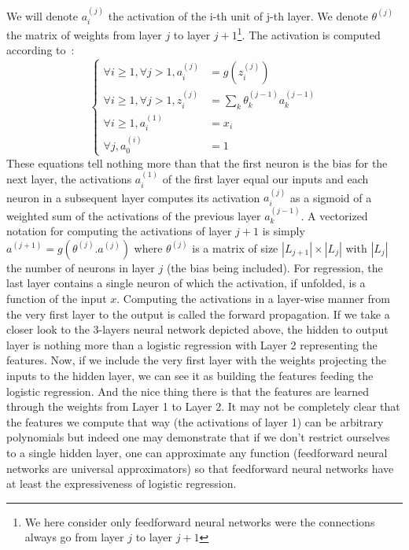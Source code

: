 \documentclass[10pt,a4paper]{article}
\begin{document}
We will denote $a_i^{(j)}$ the activation of the i-th unit of j-th
layer. We denote $\theta^{(j)}$ the matrix of weights from layer $j$
to layer $j+1$\footnote{We here consider only feedforward neural
  networks were the connections always go from layer $j$ to layer
  $j+1$}. The activation is computed according to~:
\begin{equation}
\begin{cases}
\forall i \geq 1, \forall j>1, a_i^{(j)} &= g(z_i^{(j)})\\
\forall i \geq 1, \forall j>1, z_i^{(j)} &= \sum_k \theta_k^{(j-1)} a_k^{(j-1)}\\
\forall i \geq 1, a_i^{(1)} &= x_i\\
\forall j, a_0^{(i)} &= 1
\end{cases}
\end{equation}
These equations tell nothing more than that the first neuron is the
bias for the next layer, the activations $a_i^{(1)}$ of the first layer equal our
inputs and each neuron in a subsequent layer computes its activation $a_i^{(j)}$
as a sigmoid of a weighted sum of the activations of the previous
layer $a_k^{(j-1)}$. A vectorized notation for computing the activations of layer
$j+1$ is simply $a^{(j+1)} = g(\theta^{(j)} . a^{(j)})$ where
$\theta^{(j)}$ is a matrix of size $|L_{j+1}| \times |L_{j}|$ with
$|L_j|$ the number of neurons in layer $j$ (the bias being
included). For regression, the last layer contains a single neuron of
which the activation, if unfolded, is a function of the input
$x$. Computing the activations in a layer-wise manner from the very
first layer to the output is called the forward propagation. If we
take a closer look to the 3-layers neural network depicted above, the
hidden to output layer is nothing more than a logistic regression with
Layer 2 representing the features. Now, if we include the very first
layer with the weights projecting the inputs to the hidden layer, we
can see it as building the features feeding the logistic
regression. And the nice thing there is that the features are learned
through the weights from Layer 1 to Layer 2. It may not be completely
clear that the features we compute that way (the activations of layer
1) can be arbitrary polynomials but indeed one may demonstrate that if
we don't restrict ourselves to a single hidden layer, one can
approximate any function (feedforward neural networks are universal
approximators) so that feedforward neural networks have at least the
expressiveness of logistic regression.\\
\end{document}
